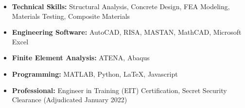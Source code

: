 \documentclass[10pt]{article}
\begin{document}
\begin{itemize}[leftmargin=0.15in, label={}, itemsep=0.1in]
  \item
    \textbf{Technical Skills:}
    Structural Analysis, Concrete Design, FEA Modeling, Materials Testing, Composite Materials

  \item
    \textbf{Engineering Software:}
    AutoCAD, RISA, MASTAN, MathCAD, Microsoft Excel
   \item
    \textbf{Finite Element Analysis:}
    ATENA, Abaqus
  \item
    \textbf{Programming:}
    MATLAB, Python, LaTeX, Javascript

  \item
    \textbf{Professional:}
    Engineer in Training (EIT) Certification, Secret Security Clearance (Adjudicated January 2022)
\end{itemize}
\end{document}
